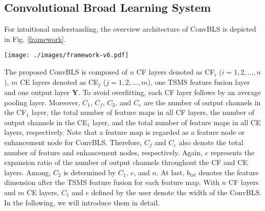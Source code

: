 \documentclass[lettersize,journal]{IEEEtran}
\begin{document}
\subsection{Convolutional Broad Learning System}
For intuitional understanding, the overview architecture of ConvBLS is depicted in Fig. \ref{framework}. 
\begin{figure*}[!t]
\centering
\texttt{[image: ./images/framework-v6.pdf]}
\caption{\textbf{Topology of Convolutional Broad Learning System.} The proposed ConvBLS stacks $\bm{n}$ CF layers and $\bm{m}$ CE layers one after another for obtaining feature node groups and enhancement node groups, respectively. Among them, all feature node groups are concatenated as the input of the first CE layer. (The gray arrow indicates that appropriate downsampling is needed to ensure successful feature concatenation.) Then, all feature node groups and enhancement node groups are connected to the TSMS feature fusion layer to yield more robust and comprehensive representations. Lastly, the weights matrix $\bm{W}_{out}$ of the output layer is obtained by the ridge regression algorithm. Note that each CF layer is followed by an average pooling layer to reduce feature dimension.
}
\label{framework}
\end{figure*}
The proposed ConvBLS is composed of $n$ CF layers denoted as CF$_i$ ($i=1,2,...,n$), $m$ CE layers denoted as CE$_j$ ($j=1,2,...,m$), one TSMS feature fusion layer and one output layer $\bm{Y}$. 
To avoid overfitting, each CF layer follows by an average pooling layer.
Moreover, $C_1$, $C_f$, $C_2$, and $C_e$ are the number of output channels in the CF$_1$ layer, the total number of feature maps in all CF layers, the number of output channels in the CE$_1$ layer, and the total number of feature maps in all CE layers, respectively. Note that a feature map is regarded as a feature node or enhancement node for ConvBLS. Therefore, $C_f$ and $C_e$ also denote the total number of feature and enhancement nodes, respectively. Again, $e$ represents the expansion ratio of the number of output channels throughout the CF and CE layers. Among, $C_2$ is determined by $C_1$, $e$, and $n$. At last, $b_{tot}$ denotes the feature dimension after 
the TSMS feature fusion for each feature map. With $n$ CF layers and $m$ CE layers, $C_1$ and $e$ defined by the user denote the width of the ConvBLS. In the following, we will introduce them in detail.
\end{document}
